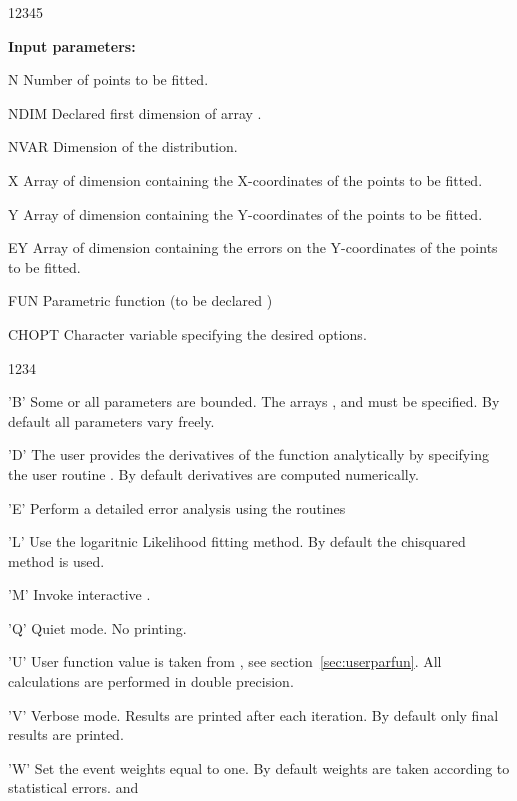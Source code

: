 \begin{DLtt}{12345}
\item[{\rm\bf Input parameters:}]
\item[N] Number of points to be fitted.
\item[NDIM] Declared first dimension of array .
\item[NVAR] Dimension of the distribution.
\item[X] Array of dimension  containing the X-coordinates
      of the points to be fitted.
\item[Y] Array of dimension  containing the Y-coordinates
      of the points to be fitted.
\item[EY] Array of dimension  containing the errors on the
      Y-coordinates of the points to be fitted.
\item[FUN] Parametric function (to be declared )
\item[CHOPT] Character variable specifying the desired options.
\begin{DLtt}{1234}
\item['B'] Some or all parameters are bounded.
           The arrays ,  and 
           must be specified.
           By default all parameters vary freely.
\item['D'] The user provides the derivatives of the function
           analytically by specifying the user routine .
           By default derivatives are computed numerically.
\item['E'] Perform a detailed error analysis using the \MINUIT{} routines
\item['L'] Use the logaritnic Likelihood fitting method.
           By default the chisquared method is used.
\item['M'] Invoke interactive .
\item['Q'] Quiet mode. No printing.
\item['U'] User function value is taken from ,
%
           see section~\ref{sec:userparfun}.
           All calculations are performed in double precision.
\item['V'] Verbose mode.
           Results are printed after each iteration.
           By default only final results are printed.
\item['W'] Set the event weights equal to one.
           By default weights are taken according to statistical errors.
 and 

\end{DLtt}
\end{DLtt}
